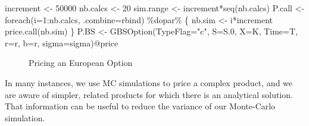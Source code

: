 \documentclass[12pt,]{tufte-book}
\newenvironment{Shaded}{}{}
\newcommand{\AttributeTok}[1]{\textcolor[rgb]{0.49,0.56,0.16}{#1}}
\newcommand{\DecValTok}[1]{\textcolor[rgb]{0.25,0.63,0.44}{#1}}
\newcommand{\FloatTok}[1]{\textcolor[rgb]{0.25,0.63,0.44}{#1}}
\newcommand{\FunctionTok}[1]{\textcolor[rgb]{0.02,0.16,0.49}{#1}}
\newcommand{\NormalTok}[1]{#1}
\newcommand{\OtherTok}[1]{\textcolor[rgb]{0.00,0.44,0.13}{#1}}
\newcommand{\SpecialCharTok}[1]{\textcolor[rgb]{0.25,0.44,0.63}{#1}}
\newcommand{\StringTok}[1]{\textcolor[rgb]{0.25,0.44,0.63}{#1}}
\begin{document}
\begin{Shaded}
\begin{Highlighting}[]
\NormalTok{increment }\OtherTok{\textless{}{-}} \DecValTok{50000}
\NormalTok{nb.calcs }\OtherTok{\textless{}{-}} \DecValTok{20}
\NormalTok{sim.range }\OtherTok{\textless{}{-}}\NormalTok{ increment}\SpecialCharTok{*}\FunctionTok{seq}\NormalTok{(nb.calcs)}
\NormalTok{P.call }\OtherTok{\textless{}{-}} \FunctionTok{foreach}\NormalTok{(}\AttributeTok{i=}\DecValTok{1}\SpecialCharTok{:}\NormalTok{nb.calcs, }\AttributeTok{.combine=}\NormalTok{rbind) }\SpecialCharTok{\%dopar\%}\NormalTok{ \{}
\NormalTok{nb.sim }\OtherTok{\textless{}{-}}\NormalTok{ i}\SpecialCharTok{*}\NormalTok{increment}
\FunctionTok{price.call}\NormalTok{(nb.sim)}
\NormalTok{\}}
\NormalTok{P.BS }\OtherTok{\textless{}{-}} \FunctionTok{GBSOption}\NormalTok{(}\AttributeTok{TypeFlag=}\StringTok{"c"}\NormalTok{, }\AttributeTok{S=}\NormalTok{S}\FloatTok{.0}\NormalTok{, }\AttributeTok{X=}\NormalTok{K, }\AttributeTok{Time=}\NormalTok{T, }\AttributeTok{r=}\NormalTok{r, }\AttributeTok{b=}\NormalTok{r, }\AttributeTok{sigma=}\NormalTok{sigma)}\SpecialCharTok{@}\NormalTok{price}
\end{Highlighting}
\end{Shaded}

\begin{figure}
\caption[Pricing an European Option]{Pricing an European Option}\label{fig:unnamed-chunk-4}
\end{figure}


In many instances, we use MC simulations to price a complex product, and we are aware of simpler, related products for which there is an analytical solution.
That information can be useful to reduce the variance of our Monte-Carlo simulation.
\end{document}
